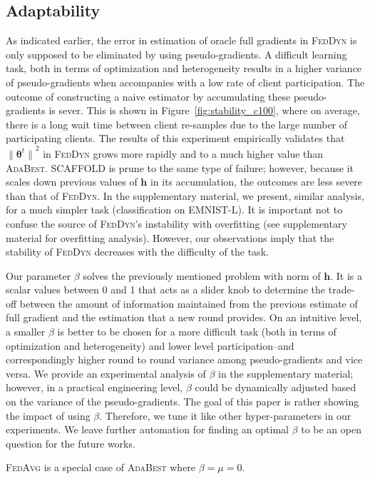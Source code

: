 \documentclass[runningheads]{llncs}
\def\figref#1{Figure~\ref{#1}}
\def\vtheta{{\bm{\theta}}}
\def\vh{{\bm{h}}}
\newcommand{\fedavg}{\textsc{FedAvg}\xspace}
\newcommand{\scaffold}{\textsc{SCAFFOLD}\xspace}
\newcommand{\feddyn}{\textsc{FedDyn}\xspace}
\newcommand{\ours}{\textsc{AdaBest}\xspace}
\def\emnist{{\textsc{EMNIST-L}}}
\begin{document}
\subsection{Adaptability} 
\label{sec:adaptability}
As indicated earlier, the error in estimation of oracle full gradients in \feddyn is only supposed to be eliminated by using pseudo-gradients. A difficult learning task, both in terms of optimization and heterogeneity results in a higher variance of pseudo-gradients when accompanies with a low rate of client participation. The outcome of constructing a naive estimator by accumulating these pseudo-gradients is sever. This is shown in \figref{fig:stability_c100}, where on average, there is a long wait time between client re-samples due to the large number of participating clients.
The results of this experiment empirically validates that ${\|\vtheta^t\|}^2$ in \feddyn grows more rapidly and to a much higher value than \ours.
\scaffold is prune to the same type of failure; however, because it scales down previous values of $\vh$ in its accumulation, the outcomes are less severe than that of \feddyn.
In the supplementary material, we present, similar analysis, for a much simpler task (classification on \emnist{}).
It is important not to confuse the source of \feddyn's instability with overfitting (see supplementary material for overfitting analysis). 
However, our observations imply that the stability of \feddyn decreases with the difficulty of the task.

Our parameter $\beta$ solves the previously mentioned problem with norm of $\vh$.
It is a scalar values between 0 and 1 that acts as a slider knob to determine the trade-off between the amount of information maintained from the previous estimate of full gradient and the estimation that a new round provides. On an intuitive level, a smaller $\beta$ is better to be chosen for a more difficult task (both in terms of optimization and heterogeneity) and lower level participation--and correspondingly higher round to round variance among pseudo-gradients and vice versa. We provide an experimental analysis of $\beta$ in the supplementary material; however, in a practical engineering level, $\beta$ could be dynamically adjusted based on the variance of the pseudo-gradients. The goal of this paper is rather showing the impact of using $\beta$. Therefore, we tune it like other hyper-parameters in our experiments.
We leave further automation for finding an optimal $\beta$ to be an open question for the future works.

\begin{remark}
\label{re:spectrum_fedavg}
\fedavg is a special case of \ours where $\beta=\mu=0$.
\end{remark}
\end{document}

